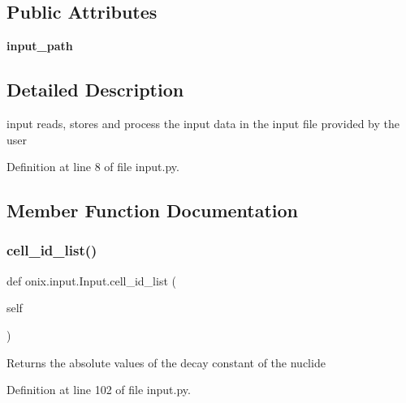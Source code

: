 \subsection*{Public Attributes}
\begin{DoxyCompactItemize}
\item 
\mbox{\label{classonix_1_1input_1_1Input_aa4a982fa1bb1a5366e128edb8b917b3a}} 
{\bfseries input\+\_\+path}
\end{DoxyCompactItemize}


\subsection{Detailed Description}
\begin{DoxyVerb}input reads, stores and process the input data in the input file provided by the user\end{DoxyVerb}
 

Definition at line 8 of file input.\+py.



\subsection{Member Function Documentation}
\mbox{\label{classonix_1_1input_1_1Input_a889fcf9e43cde20a4a00165166304028}} 
\subsubsection{\texorpdfstring{cell\+\_\+id\+\_\+list()}{cell\_id\_list()}}
{\footnotesize\ttfamily def onix.\+input.\+Input.\+cell\+\_\+id\+\_\+list (\begin{DoxyParamCaption}\item[{}]{self }\end{DoxyParamCaption})}

\begin{DoxyVerb}Returns the absolute values of the decay constant of the nuclide\end{DoxyVerb}
 

Definition at line 102 of file input.\+py.

\mbox{\label{classonix_1_1input_1_1Input_a57cfadd12e115631f7c692da7d6a9373}} 
